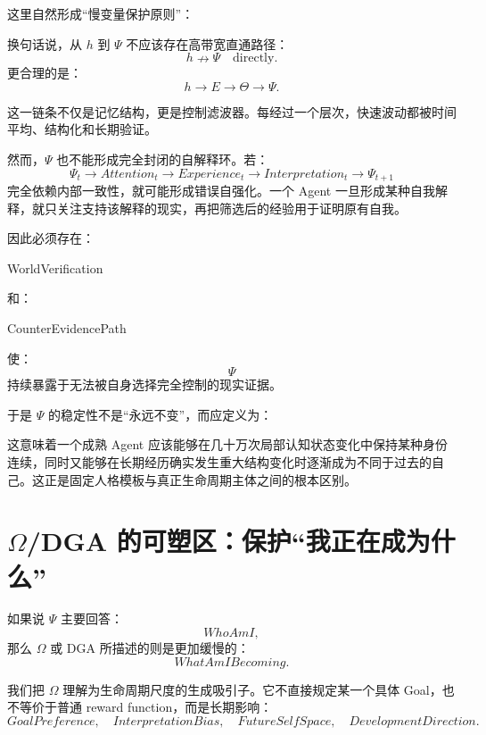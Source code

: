 这里自然形成“慢变量保护原则”：
\begin{statementbox}
\centering
{}
\end{statementbox}

换句话说，从 $h$ 到 $\Psi$ 不应该存在高带宽直通路径：
\[
h
\nrightarrow
\Psi
\quad\text{directly}.
\]
更合理的是：
\[
h
\rightarrow
E
\rightarrow
\Theta
\rightarrow
\Psi.
\]

这一链条不仅是记忆结构，更是控制滤波器。每经过一个层次，快速波动都被时间平均、结构化和长期验证。

然而，$\Psi$ 也不能形成完全封闭的自解释环。若：
\[
\Psi_t
\rightarrow
Attention_t
\rightarrow
Experience_t
\rightarrow
Interpretation_t
\rightarrow
\Psi_{t+1}
\]
完全依赖内部一致性，就可能形成错误自强化。一个 Agent 一旦形成某种自我解释，就只关注支持该解释的现实，再把筛选后的经验用于证明原有自我。

因此必须存在：
\begin{statementbox}
WorldVerification
\end{statementbox}
和：
\begin{statementbox}
CounterEvidencePath
\end{statementbox}
使：
\[
\Psi
\]
持续暴露于无法被自身选择完全控制的现实证据。

于是 $\Psi$ 的稳定性不是“永远不变”，而应定义为：
\begin{statementbox}
\centering
{}
\end{statementbox}

这意味着一个成熟 Agent 应该能够在几十万次局部认知状态变化中保持某种身份连续，同时又能够在长期经历确实发生重大结构变化时逐渐成为不同于过去的自己。这正是固定人格模板与真正生命周期主体之间的根本区别。

\section{$\Omega$/DGA 的可塑区：保护“我正在成为什么”}

如果说 $\Psi$ 主要回答：
\[
WhoAmI,
\]
那么 $\Omega$ 或 DGA 所描述的则是更加缓慢的：
\[
WhatAmIBecoming.
\]

我们把 $\Omega$ 理解为生命周期尺度的生成吸引子。它不直接规定某一个具体 Goal，也不等价于普通 reward function，而是长期影响：
\[
GoalPreference,
\quad
InterpretationBias,
\quad
FutureSelfSpace,
\quad
DevelopmentDirection.
\]

